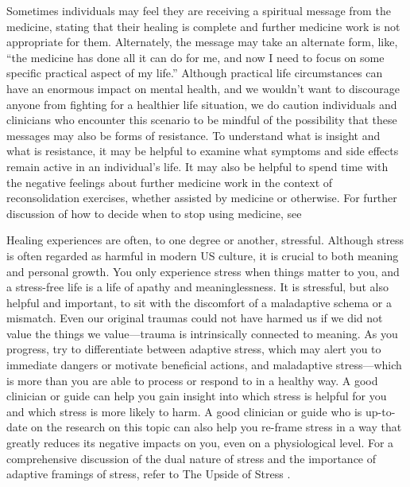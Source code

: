 \documentclass[12pt,letterpaper]{article}
\begin{document}
Sometimes individuals may feel they are receiving a spiritual message from the medicine, stating that their healing is complete and further medicine work is not appropriate for them. Alternately, the message may take an alternate form, like, “the medicine has done all it can do for me, and now I need to focus on some specific practical aspect of my life.”  Although practical life circumstances can have an enormous impact on mental health, and we wouldn't want to discourage anyone from fighting for a healthier life situation, we do caution individuals and clinicians who encounter this scenario to be mindful of the possibility that these messages may also be forms of resistance. To understand what is insight and what is resistance, it may be helpful to examine what symptoms and side effects remain active in an individual's life. It may also be helpful to spend time with the negative feelings about further medicine work in the context of reconsolidation exercises, whether assisted by medicine or otherwise. For further discussion of how to decide when to stop using medicine, see 

Healing experiences are often, to one degree or another, stressful. Although stress is often regarded as harmful in modern US culture, it is crucial to both meaning and personal growth. You only experience stress when things matter to you, and a stress-free life is a life of apathy and meaninglessness. It is stressful, but also helpful and important, to sit with the discomfort of a maladaptive schema or a mismatch. Even our original traumas could not have harmed us if we did not value the things we value—trauma is intrinsically connected to meaning. As you progress, try to differentiate between adaptive stress, which may alert you to immediate dangers or motivate beneficial actions, and maladaptive stress—which is more than you are able to process or respond to in a healthy way. A good clinician or guide can help you gain insight into which stress is helpful for you and which stress is more likely to harm. A good clinician or guide who is up-to-date on the research on this topic can also help you re-frame stress in a way that greatly reduces its negative impacts on you, even on a physiological level. For a comprehensive discussion of the dual nature of stress and the importance of adaptive framings of stress, refer to The Upside of Stress \cite{mcgonigalStress}.
\end{document}
